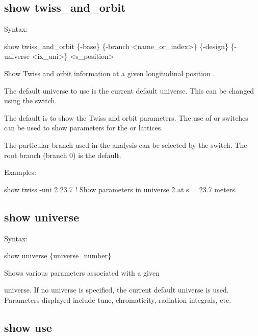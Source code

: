{{{{{{\subsection{show twiss_and_orbit}
\label{s:show.twiss}

Syntax:
\begin{example}
    show twiss_and_orbit \{-base\} \{-branch <name_or_index>\} \{-design\}
    \{-universe <ix_uni>\} <s_position>
\end{example}

Show Twiss and orbit information at a given longitudinal position . 

The default universe to use is the current default universe. This can be changed using the
 switch.

The default is to show the  Twiss and orbit parameters. The use of  or
 switches can be used to show parameters for the  or 
lattices.

The particular branch used in the analysis can be selected by the  switch. The
root branch (branch 0) is the default.

Examples:
\begin{example}
  show twiss -uni 2 23.7     ! Show parameters in universe 2 at s = 23.7 meters.
\end{example} 


\subsection{show universe}
\label{s:show.universe}

Syntax:
\begin{example}
  show universe \{universe_number\}
\end{example}

Shows various parameters associated with a given

universe. If no universe is specified, the current default universe is used. Parameters
displayed include tune, chromaticity, radiation integrals, etc.


\subsection{show use}
\label{s:show.use}

}}}}}}
